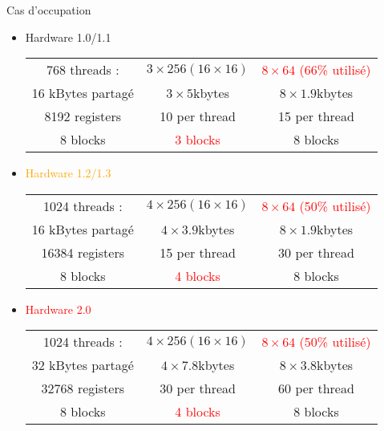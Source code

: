 \documentclass{beamer}
\begin{document}
\begin{frame}{Cas d'occupation}

\begin{itemize} 
\item \textcolor{green!60!black}{Hardware 1.0/1.1}
  \begin{tabular}{c|c|c}\hline
  768 threads : & 
    \textcolor{green!60!black}{$3\times 256 (16\times 16)$} &
    \textcolor{red}{$8\times 64$ (66\% utilisé)}\\
  16 kBytes partagé &
    \textcolor{green!60!black}{$3\times 5$}kbytes &
    \textcolor{green!60!black}{$8\times 1.9$}kbytes \\
  8192 registers &
    \textcolor{green!60!black}{10 per thread} &
    \textcolor{green!60!black}{15 per thread} \\
  8 blocks & 
    \textcolor{red}{3 blocks} &
    \textcolor{green!60!black}{8 blocks} \\ \hline
  \end{tabular}
\item \textcolor{orange}{Hardware 1.2/1.3}
  \begin{tabular}{c|c|c}\hline
  1024 threads : & 
    \textcolor{green!60!black}{$4\times 256 (16\times 16)$} &
    \textcolor{red}{$8\times 64$ (50\% utilisé)}\\
  16 kBytes partagé &
    \textcolor{green!60!black}{$4\times 3.9$}kbytes &
    \textcolor{green!60!black}{$8\times 1.9$}kbytes \\
  16384 registers &
    \textcolor{green!60!black}{15 per thread} &
    \textcolor{green!60!black}{30 per thread} \\
  8 blocks & 
    \textcolor{red}{4 blocks} &
    \textcolor{green!60!black}{8 blocks} \\ \hline
  \end{tabular}
\item \textcolor{red}{Hardware 2.0}
  \begin{tabular}{c|c|c}\hline
  1024 threads : & 
    \textcolor{green!60!black}{$4\times 256 (16\times 16)$} &
    \textcolor{red}{$8\times 64$ (50\% utilisé)}\\
  32 kBytes partagé &
    \textcolor{green!60!black}{$4\times 7.8$}kbytes &
    \textcolor{green!60!black}{$8\times 3.8$}kbytes \\
  32768 registers &
    \textcolor{green!60!black}{30 per thread} &
    \textcolor{green!60!black}{60 per thread} \\
  8 blocks & 
    \textcolor{red}{4 blocks} &
    \textcolor{green!60!black}{8 blocks} \\ \hline
  \end{tabular}\end{itemize}
\end{frame}
\end{document}
